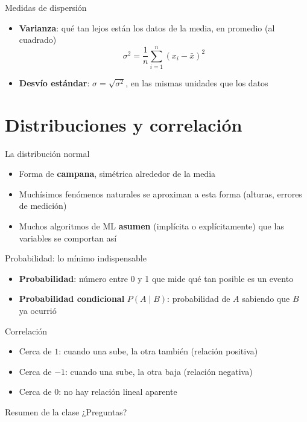 \begin{frame}{Medidas de dispersión}
  \begin{itemize}
    \item \textbf{Varianza}: qué tan lejos están los datos de la media, en promedio (al cuadrado)
      $$\sigma^2 = \frac{1}{n}\sum_{i=1}^{n} (x_i - \bar{x})^2$$
    \item \textbf{Desvío estándar}: $\sigma = \sqrt{\sigma^2}$, en las mismas unidades que los datos
  \end{itemize}
  \pause
\end{frame}

\section{Distribuciones y correlación}

\begin{frame}{La distribución normal}
  \begin{itemize}
    \item Forma de \textbf{campana}, simétrica alrededor de la media
    \item Muchísimos fenómenos naturales se aproximan a esta forma (alturas, errores de medición)
    \item Muchos algoritmos de ML \textbf{asumen} (implícita o explícitamente) que las variables se comportan así
  \end{itemize}
\end{frame}

\begin{frame}{Probabilidad: lo mínimo indispensable}
  \begin{itemize}
    \item \textbf{Probabilidad}: número entre 0 y 1 que mide qué tan posible es un evento
    \item \textbf{Probabilidad condicional} $P(A \mid B)$: probabilidad de $A$ sabiendo que $B$ ya ocurrió
  \end{itemize}
\end{frame}

\begin{frame}{Correlación}
  \begin{itemize}
    \item Cerca de $1$: cuando una sube, la otra también (relación positiva)
    \item Cerca de $-1$: cuando una sube, la otra baja (relación negativa)
    \item Cerca de $0$: no hay relación lineal aparente
  \end{itemize}
\end{frame}

\begin{frame}{Resumen de la clase}
  \centering
  \Large ¿Preguntas?
\end{frame}


